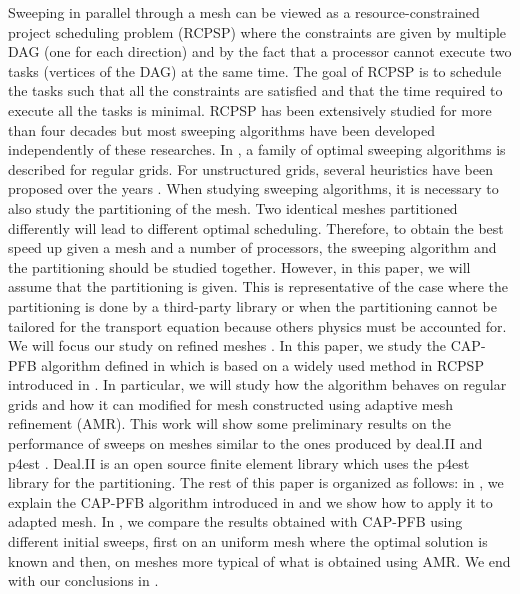 \documentclass[letterpaper]{article}
\renewcommand{\(}{\left(}
\renewcommand{\)}{\right)}
\renewcommand{\[}{\left[}
\renewcommand{\]}{\right]}
\begin{document}
Sweeping in parallel through a mesh can be viewed as a resource-constrained
project scheduling problem (RCPSP) \cite{Brucker1999,Kolisch2006} where the
constraints are given by multiple DAG (one for each direction) and by the fact
that a processor cannot execute two tasks (vertices of the DAG) at the same
time. The goal of RCPSP is to schedule the tasks such that all the constraints are
satisfied and that the time required to execute all the tasks is minimal. 
RCPSP has been extensively studied for more than four decades \cite{Pritsker1969} but most
sweeping algorithms have been developed independently of these researches. 
In \cite{Adams2013}, a family of optimal sweeping algorithms is described for
regular grids. For unstructured grids, several heuristics have been proposed
over the years \cite{Pautz2002,Plimpton2005,Yan2013,Colomer2013,Kumar2005,Mo2014}. When
studying sweeping algorithms, it is necessary to also study the partitioning of
the mesh. Two identical meshes partitioned differently will lead to different
optimal scheduling. Therefore, to obtain the best speed up given a mesh and a
number of processors, the sweeping algorithm and the partitioning should be
studied together. However, in this paper, we will assume that the partitioning
is given. This is representative of the case where the partitioning is done by a
third-party library or when the partitioning cannot be tailored for the
transport equation because others physics must be accounted for. We will focus
our study on refined meshes
\cite{Arnold2000,Baker2002,Bangerth2007,Jessee1998,Wang2010a}.
In this paper, we
study the CAP-PFB algorithm defined in \cite{Mo2014} which is based on a widely
used method in RCPSP introduced in \cite{Li1992}. In particular, we will study
how the algorithm behaves on regular grids and how it can modified for mesh
constructed using adaptive mesh refinement (AMR). This work will show some
preliminary results on the performance of sweeps on meshes similar to the ones
produced by deal.II \cite{Bangerth2007,Bangerth2013} and p4est
\cite{Burstedde2011}. Deal.II is an open source finite element library which
uses the p4est library for the partitioning. The rest of this paper is organized
as follows: in , we explain the CAP-PFB algorithm
introduced in \cite{Mo2014} and we show how to apply it to adapted mesh. In
, we compare the results obtained with CAP-PFB using different initial sweeps, first on 
an uniform mesh where the optimal
solution is known and then, on meshes more typical of what is obtained using
AMR. We end with our conclusions in .
\end{document}
